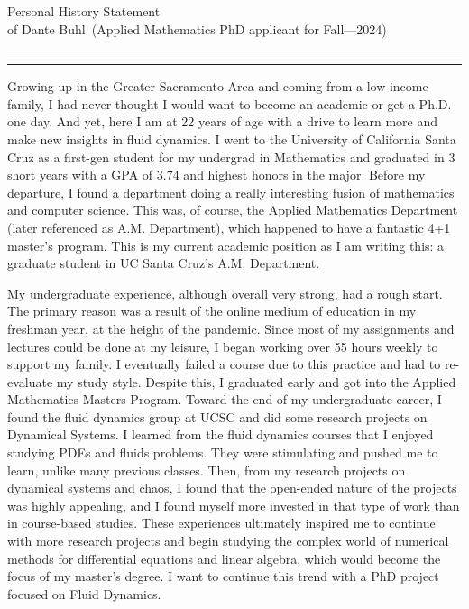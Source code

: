 \documentclass{article}
\newcommand{\soptitle}{Personal History Statement}
\newcommand{\yourname}{Dante Buhl}
\begin{document}
\begin{center}\LARGE\soptitle\\
\large of \yourname\ (Applied Mathematics PhD applicant for Fall---2024)
\end{center}

\hrule
\vspace{1pt}
\hrule height 1pt

\bigskip

\large
Growing up in the Greater Sacramento Area and coming from a low-income family, I had never thought I would want to become an academic or get a Ph.D. one day. And yet, here I am at 22 years of age with a drive to learn more and make new insights in fluid dynamics. I went to the University of California Santa Cruz as a first-gen student for my undergrad in Mathematics and graduated in 3 short years with a GPA of 3.74 and highest honors in the major. Before my departure, I found a department doing a really interesting fusion of mathematics and computer science. This was, of course, the Applied Mathematics Department (later referenced as A.M. Department), which happened to have a fantastic 4+1 master's program. This is my current academic position as I am writing this: a graduate student in UC Santa Cruz's A.M. Department. 

My undergraduate experience, although overall very strong, had a rough start. The primary reason was a result of the online medium of education in my freshman year, at the height of the pandemic. Since most of my assignments and lectures could be done at my leisure, I began working over 55 hours weekly to support my family. I eventually failed a course due to this practice and had to re-evaluate my study style. Despite this, I graduated early and got into the Applied Mathematics Masters Program. Toward the end of my undergraduate career, I found the fluid dynamics group at UCSC and did some research projects on Dynamical Systems. I learned from the fluid dynamics courses that I enjoyed studying PDEs and fluids problems. They were stimulating and pushed me to learn, unlike many previous classes. Then, from my research projects on dynamical systems and chaos, I found that the open-ended nature of the projects was highly appealing, and I found myself more invested in that type of work than in course-based studies. These experiences ultimately inspired me to continue with more research projects and begin studying the complex world of numerical methods for differential equations and linear algebra, which would become the focus of my master's degree. I want to continue this trend with a PhD project focused on Fluid Dynamics.
\end{document}

